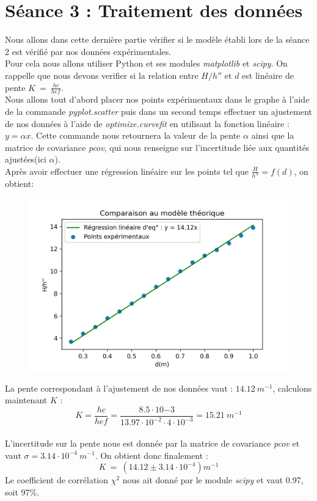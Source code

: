 \documentclass[12pt,a4paper]{article}
\begin{document}
\section{Séance 3 : Traitement des données}
Nous allons dans cette dernière partie vérifier si le modèle établi lors de la séance 2 est vérifié par nos données expérimentales.\\
Pour cela nous allons utiliser Python et ses modules \textit{matplotlib} et \textit{scipy}. On rappelle que nous devons verifier si la relation entre $H/h''$ et $d$ est linéaire de pente $K~=~\frac{hc}{hef}$. \\
Nous allons tout d'abord placer nos points expérimentaux dans le graphe à l'aide de la commande \textit{pyplot.scatter} puis dans un second temps effectuer un ajustement de nos données à l'aide de \textit{optimize.curvefit} en utilisant la fonction linéaire : $y = \alpha  x$. Cette commande nous retournera la valeur de la pente $\alpha$ ainsi que la matrice de covariance \textit{pcov}, qui nous renseigne sur l'incertitude liée aux quantités ajustées(ici $\alpha$).\\
Après avoir effectuer une régression linéaire sur les points tel que $\frac{H}{h''}=f(d)$, on obtient:
\begin{figure}[H]
\begin{center}
\includegraphics[scale=1]{Figures/opt}
\end{center}
\end{figure}


La pente correspondant à l'ajustement de nos données vaut : $14.12~m^{-1}$, calculons maintenant $K$ :
$$K=\frac{hc}{hef} = \frac{8.5\cdot 10{-3}}{13.97\cdot 10^{-2}\cdot4\cdot 10^{-3}}=15.21 ~m^{-1}$$\\
L'incertitude sur la pente nous est donnée par la matrice de covariance \textit{pcov} et vaut $\sigma = 3.14\cdot 10^{-4}~m^{-1}$. On obtient donc finalement : $$\boxed{K~=~(14.12 \pm 3.14\cdot10^{-4})m^{-1}}$$ Le coefficient de corrélation $\chi^{2}$ nous ait donné par le module \textit{scipy} et vaut 0.97, soit 97\%.\\
\end{document}
